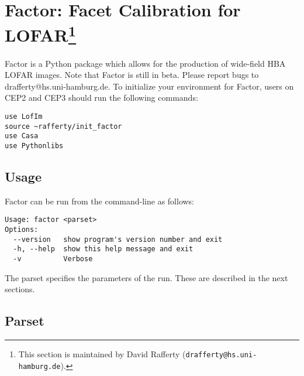 \documentclass[structabstract]{article}
\begin{document}

\section[Factor: Facet Calibration for LOFAR]{Factor: Facet Calibration for
LOFAR\footnote{This section is maintained by David Rafferty
({\tt drafferty@hs.uni-hamburg.de}).}}
\label{factor}

Factor is a Python package which allows for the production of wide-field HBA
LOFAR images. Note that Factor is still in beta. Please report bugs to
drafferty@hs.uni-hamburg.de. To initialize your environment for Factor, users on
CEP2 and CEP3 should run the following commands:
\begin{verbatim}
use LofIm
source ~rafferty/init_factor
use Casa
use Pythonlibs
\end{verbatim}

\subsection{Usage}
\label{factor:usage}

Factor can be run from the command-line as follows:
\begin{verbatim}
Usage: factor <parset>
Options:
  --version   show program's version number and exit
  -h, --help  show this help message and exit
  -v          Verbose
\end{verbatim}
The parset specifies the parameters of the run. These are described in the next
sections.

\subsection{Parset}
\label{factor:parset}
\end{document}
